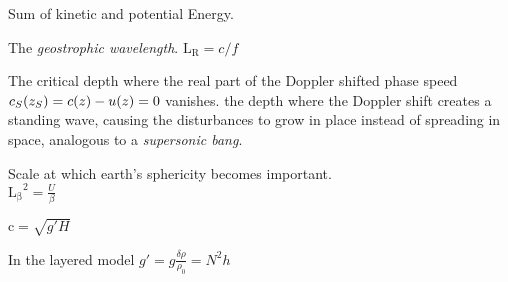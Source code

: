 \begin{multicols}{3}
\begin{definition} \label{def:E_k}
\end{definition}

\begin{definition} \label{def:E_m}
Sum of kinetic and potential Energy.
\end{definition}


\begin{definition}\label{def:Lr}
The \textit{geostrophic wavelength}.
$\mathrm{L_{R}} = c/f $
 \end{definition}



\begin{definition}\label{def:steer}
The critical depth where the real part of the Doppler shifted phase
speed $c_S(z_S)=\real{c(z)}-u(z)=0$ vanishes. \Ie the depth where the Doppler shift
creates a standing wave, causing the disturbances to grow in place instead of
spreading in space, analogous to a \textit{supersonic bang}.
 \end{definition}



\begin{definition}\label{def:Lb}
Scale at which earth's sphericity becomes important.\\
$\mathrm{L_{\beta}}^2 = \frac{U}{\beta} $
 \end{definition}



\begin{definition}\label{def:c}
$\mathrm{c}  = \sqrt{g'H} $
 \end{definition}



\begin{definition}\label{def:gr}
In the layered model $g'=g \frac{\delta \rho}{\rho_0} = N^{2}h$
 \end{definition}




\end{multicols}
